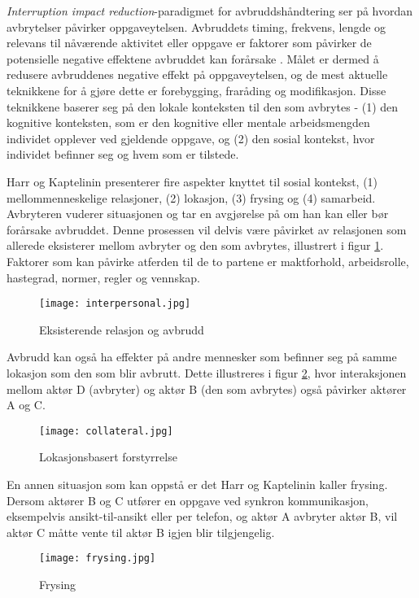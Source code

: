 \noindent
\emph{Interruption impact reduction}-paradigmet for avbruddshåndtering ser på hvordan avbrytelser påvirker oppgaveytelsen. Avbruddets timing, frekvens, lengde og relevans til nåværende aktivitet eller oppgave er faktorer som påvirker de potensielle negative effektene avbruddet kan forårsake \citep{Grandhi10, Harr07}.
Målet er dermed å redusere avbruddenes negative effekt på oppgaveytelsen, og de mest aktuelle teknikkene for å gjøre dette er forebygging, fraråding og modifikasjon. Disse teknikkene baserer seg på den lokale konteksten til den som avbrytes - (1) den kognitive konteksten, som er den kognitive eller mentale arbeidsmengden individet opplever ved gjeldende oppgave, og (2) den sosial kontekst, hvor individet befinner seg og hvem som er tilstede. 
 
\noindent
Harr og Kaptelinin presenterer fire aspekter knyttet til sosial kontekst, (1) mellommenneskelige relasjoner, (2) lokasjon, (3) frysing og (4) samarbeid.
\noindent
Avbryteren vuderer situasjonen og tar en avgjørelse på om han kan eller bør forårsake avbruddet. Denne prosessen vil delvis være påvirket av relasjonen som allerede eksisterer mellom avbryter og den som avbrytes, illustrert i figur \ref{interpersonal}. Faktorer som kan påvirke atferden til de to partene er maktforhold, arbeidsrolle, hastegrad, normer, regler og vennskap. 
\begin{figure}[H]
\centering
\texttt{[image: interpersonal.jpg]}
\caption{Eksisterende relasjon og avbrudd}
\label{interpersonal}
\end{figure}

\noindent
Avbrudd kan også ha effekter på andre mennesker som befinner seg på samme lokasjon som den som blir avbrutt. Dette illustreres i figur \ref{collateral}, hvor interaksjonen mellom aktør D (avbryter) og aktør B (den som avbrytes) også påvirker aktører A og C.
\begin{figure}[H]
\centering
\texttt{[image: collateral.jpg]}
\caption{Lokasjonsbasert forstyrrelse}
\label{collateral}
\end{figure}

\noindent
En annen situasjon som kan oppstå er det Harr og Kaptelinin kaller frysing. Dersom aktører B og C utfører en oppgave ved synkron kommunikasjon, eksempelvis ansikt-til-ansikt eller per telefon, og aktør A avbryter aktør B, vil aktør C måtte vente til aktør B igjen blir tilgjengelig. 
\begin{figure}[H]
\centering
\texttt{[image: frysing.jpg]}
\caption{Frysing}
\label{frysing}
\end{figure}

